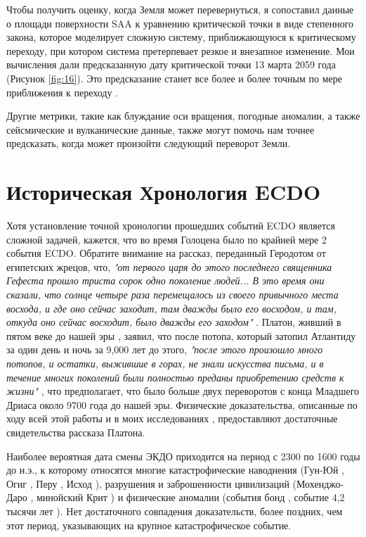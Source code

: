\documentclass[10pt,twocolumn,letterpaper]{article}
\begin{document}
Чтобы получить оценку, когда Земля может перевернуться, я сопоставил данные о площади поверхности SAA к уравнению критической точки в виде степенного закона, которое моделирует сложную систему, приближающуюся к критическому переходу, при котором система претерпевает резкое и внезапное изменение. Мои вычисления дали предсказанную дату критической точки 13 марта 2059 года (Рисунок \ref{fig:16}). Это предсказание станет все более и более точным по мере приближения к переходу \cite{136}.

Другие метрики, такие как блуждание оси вращения, погодные аномалии, а также сейсмические и вулканические данные, также могут помочь нам точнее предсказать, когда может произойти следующий переворот Земли.

\section{Историческая Хронология ECDO}

Хотя установление точной хронологии прошедших событий ECDO является сложной задачей, кажется, что во время Голоцена было по крайней мере 2 события ECDO. Обратите внимание на рассказ, переданный Геродотом от египетских жрецов, что, \textit{"от первого царя до этого последнего священника Гефеста прошло триста сорок одно поколение людей... В это время они сказали, что солнце четыре раза перемещалось из своего привычного места восхода, и где оно сейчас заходит, там дважды было его восходом, и там, откуда оно сейчас восходит, было дважды его заходом"} \cite{32}. Платон, живший в пятом веке до нашей эры \cite{111}, заявил, что после потопа, который затопил Атлантиду за один день и ночь за 9,000 лет до этого, \textit{"после этого произошло много потопов, и остатки, выжившие в горах, не знали искусства письма, и в течение многих поколений были полностью преданы приобретению средств к жизни"} \cite{112}, что предполагает, что было больше двух переворотов с конца Младшего Дриаса около 9700 года до нашей эры. Физические доказательства, описанные по ходу всей этой работы и в моих исследованиях \cite{2}, предоставляют достаточные свидетельства рассказа Платона.

Наиболее вероятная дата смены ЭКДО приходится на период с 2300 по 1600 годы до н.э., к которому относятся многие катастрофические наводнения (Гун-Юй \cite{113,114,115}, Огиг \cite{116,117}, Перу \cite{118,119}, Исход \cite{120}), разрушения и заброшенности цивилизаций (Мохенджо-Даро \cite{121}, минойский Крит \cite{100,101}) и физические аномалии (события бонд \cite{122}, событие 4,2 тысячи лет \cite{90}). Нет достаточного совпадения доказательств, более поздних, чем этот период, указывающих на крупное катастрофическое событие.
\end{document}
